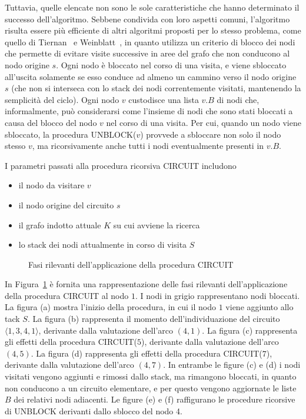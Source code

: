 Tuttavia, quelle elencate non sono le sole caratteristiche che hanno determinato il successo dell'algoritmo.
Sebbene condivida con loro aspetti comuni, l'algoritmo risulta essere pi\`u efficiente di altri algoritmi
proposti per lo stesso problema, come quello di Tiernan~\cite{10.1145/362814.362819} e
Weinblatt~\cite{10.1145/321679.321684}, in quanto utilizza un criterio di blocco
dei nodi che permette di evitare visite successive in aree del grafo che non conducono al nodo origine $s$.
Ogni nodo \`e bloccato nel corso di una visita, e viene sbloccato all'uscita solamente se esso conduce ad almeno
un cammino verso il nodo origine $s$ (che non si interseca con lo stack dei nodi correntemente visitati, mantenendo
la semplicit\`a del ciclo).
Ogni nodo $v$ custodisce una lista $v.B$ di nodi che, informalmente, pu\`o considerarsi come l'insieme di nodi
che sono stati bloccati a causa del blocco del nodo $v$ nel corso di una visita.
Per cui, quando un nodo viene sbloccato, la procedura UNBLOCK($v$) provvede a sbloccare non solo il nodo stesso $v$,
ma ricorsivamente anche tutti i nodi eventualmente presenti in $v.B$.



\newpage

I parametri passati alla procedura ricorsiva CIRCUIT includono
\begin{itemize}
    \item il nodo da visitare $v$
    \item il nodo origine del circuito $s$
    \item il grafo indotto attuale $K$ su cui avviene la ricerca
    \item lo stack dei nodi attualmente in corso di visita $S$
\end{itemize}




\begin{figure}
    \centering
    
\caption{Fasi rilevanti dell'applicazione della procedura CIRCUIT}\label{fig:circuit-example}
\end{figure}

In Figura~\ref{fig:circuit-example} \`e fornita una rappresentazione delle fasi rilevanti dell'applicazione della
procedura CIRCUIT al nodo $1$. I nodi in grigio rappresentano nodi bloccati.
La figura (a) mostra l'inizio della procedura, in cui il nodo $1$ viene aggiunto allo tack $S$.
La figura (b) rappresenta il momento dell'individuazione del circuito $\langle 1, 3, 4, 1 \rangle$, derivante dalla valutazione
dell'arco $(4, 1)$.
La figura (c) rappresenta gli effetti della procedura CIRCUIT($5$), derivante dalla valutazione dell'arco $(4, 5)$.
La figura (d) rappresenta gli effetti della procedura CIRCUIT($7$), derivante dalla valutazione dell'arco $(4, 7)$.
In entrambe le figure (c) e (d) i nodi visitati vengono aggiunti e rimossi dallo stack, ma rimangono bloccati,
in quanto non conducono a un circuito elementare, e per questo vengono aggiornate le liste $B$ dei relativi
nodi adiacenti.
Le figure (e) e (f) raffigurano le procedure ricorsive di UNBLOCK derivanti dallo sblocco del nodo 4.


